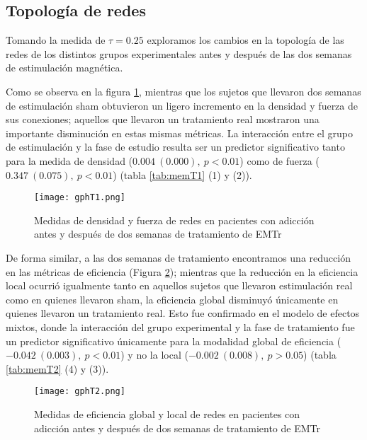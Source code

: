 \subsection{Topología de redes}
Tomando la medida de $\tau = 0.25$ exploramos los cambios en la topología de las redes de los distintos grupos experimentales antes y después de las dos semanas de estimulación magnética.\par
Como se observa en la figura \ref{fig:gpT1}, mientras que los sujetos que llevaron dos semanas de estimulación sham obtuvieron un ligero incremento en la densidad y fuerza de sus conexiones; aquellos que llevaron un tratamiento real mostraron una importante disminución en estas mismas métricas. La interacción entre el grupo de estimulación y la fase de estudio resulta ser un predictor significativo tanto para la medida de densidad ($0.004\ (0.000),\ p<0.01$) como de fuerza ($0.347\ (0.075),\ p<0.01$) (tabla \ref{tab:memT1} (1) y (2)).\par

\begin{figure}[!tb]
    \centering
    \texttt{[image: gphT1.png]}
    \caption{Medidas de densidad y fuerza de redes en pacientes con adicción antes y después de dos semanas de tratamiento de EMTr}
    \label{fig:gpT1}
\end{figure}

De forma similar, a las dos semanas de tratamiento encontramos una reducción en las métricas de eficiencia (Figura \ref{fig:gpT2}); mientras que la reducción en la eficiencia local ocurrió igualmente tanto en aquellos sujetos que llevaron estimulación real como en quienes llevaron sham, la eficiencia global disminuyó únicamente en quienes llevaron un tratamiento real. Esto fue confirmado en el modelo de efectos mixtos, donde la interacción del grupo experimental y la fase de tratamiento fue un predictor significativo únicamente para la modalidad global de eficiencia ($-0.042\ (0.003),\ p<0.01$) y no la local ($-0.002\ (0.008),\ p>0.05$) (tabla \ref{tab:memT2} (4) y (3)).\par

\begin{figure}[!htb]
    \centering
    \texttt{[image: gphT2.png]}
    \caption{Medidas de eficiencia global y local de redes en pacientes con adicción antes y después de dos semanas de tratamiento de EMTr}
    \label{fig:gpT2}
\end{figure}


